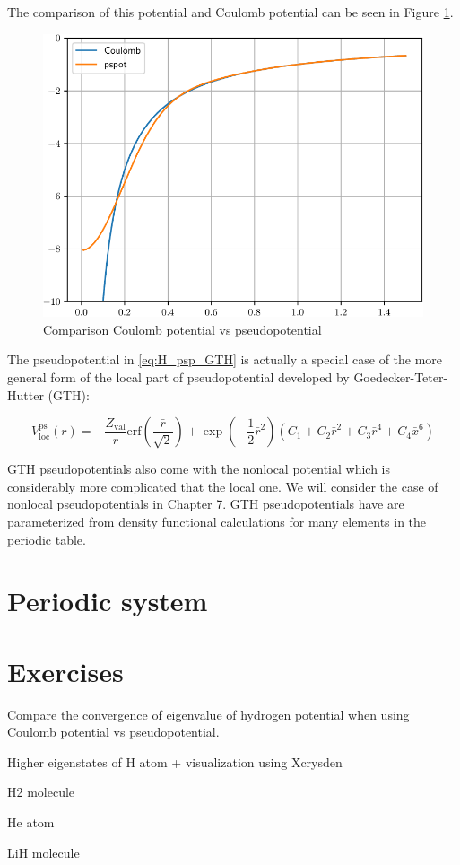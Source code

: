 The comparison of this potential and Coulomb potential can be seen in
Figure \ref{fig:compare_H_pspot}.
\begin{figure}[h]
{\centering
\includegraphics[width=\textwidth]{../codes/sch_3d/IMG_H_Coulomb_vs_pspot.pdf}
\par}
\caption{Comparison Coulomb potential vs pseudopotential}
\label{fig:compare_H_pspot}
\end{figure}

The pseudopotential in \ref{eq:H_psp_GTH} is actually a special case of the more general
form of the local part of pseudopotential developed by Goedecker-Teter-Hutter (GTH):
\begin{fullwidth}
\begin{equation}
V^{\mathrm{ps}}_{\mathrm{loc}}(r) = -\frac{Z_{\mathrm{val}}}{r}
\mathrm{erf}\left( \frac{\bar{r}}{\sqrt{2}} \right) +
\exp\left( -\frac{1}{2}\bar{r}^2 \right)
\left( C_{1} + C_{2}\bar{r}^2 + C_{3}\bar{r}^4 + C_{4}\bar{x}^6\right)
\label{eq:V_loc_GTH}
\end{equation}
\end{fullwidth}
GTH pseudopotentials also come with the nonlocal potential which is considerably more complicated
that the local one.
We will consider the case of nonlocal pseudopotentials in Chapter 7.
GTH pseudopotentials have are parameterized from density functional calculations for many elements
in the periodic table. 


\section{Periodic system}


\section{Exercises}

Compare the convergence of eigenvalue of hydrogen potential when using Coulomb potential
vs pseudopotential.

Higher eigenstates of H atom + visualization using Xcrysden

H2 molecule

He atom

LiH molecule